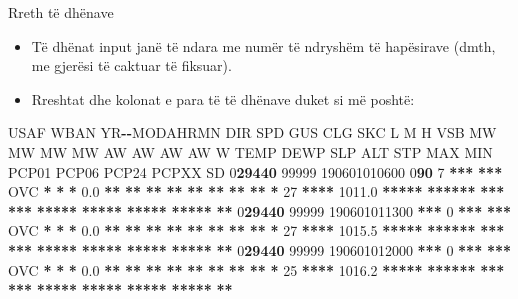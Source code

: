 \documentclass[
  ignorenonframetext,
]{beamer}
\newenvironment{Shaded}{\begin{snugshade}}{\end{snugshade}}
\newcommand{\DecValTok}[1]{\textcolor[rgb]{0.00,0.00,0.81}{#1}}
\newcommand{\ErrorTok}[1]{\textcolor[rgb]{0.64,0.00,0.00}{\textbf{#1}}}
\newcommand{\FloatTok}[1]{\textcolor[rgb]{0.00,0.00,0.81}{#1}}
\newcommand{\NormalTok}[1]{#1}
\newcommand{\OperatorTok}[1]{\textcolor[rgb]{0.81,0.36,0.00}{\textbf{#1}}}
\begin{document}
\begin{frame}[fragile]{Rreth të dhënave}
\protect\hypertarget{rreth-tuxeb-dhuxebnave}{}
\begin{itemize}
\item
  Të dhënat input janë të ndara me numër të ndryshëm të hapësirave
  (dmth, me gjerësi të caktuar të fiksuar).
\item
  Rreshtat dhe kolonat e para të të dhënave duket si më poshtë:
\end{itemize}

\begin{Shaded}
\begin{Highlighting}[]
\NormalTok{  USAF  WBAN YR}\OperatorTok{{-}{-}}\NormalTok{MODAHRMN DIR SPD GUS CLG SKC L M H  VSB MW MW MW MW AW AW AW AW W TEMP DEWP    SLP   ALT    STP MAX MIN PCP01 PCP06 PCP24 PCPXX SD}
\DecValTok{0}\ErrorTok{29440} \DecValTok{99999} \DecValTok{190601010600} \DecValTok{0}\ErrorTok{90}   \DecValTok{7} \OperatorTok{***} \OperatorTok{***}\NormalTok{ OVC }\OperatorTok{*} \OperatorTok{*} \OperatorTok{*}  \FloatTok{0.0} \OperatorTok{**} \OperatorTok{**} \OperatorTok{**} \OperatorTok{**} \OperatorTok{**} \OperatorTok{**} \OperatorTok{**} \OperatorTok{**} \OperatorTok{*}   \DecValTok{27} \OperatorTok{****} \FloatTok{1011.0} \OperatorTok{*****} \OperatorTok{******} \OperatorTok{***} \OperatorTok{***} \OperatorTok{*****} \OperatorTok{*****} \OperatorTok{*****} \OperatorTok{*****} \OperatorTok{**} 
\DecValTok{0}\ErrorTok{29440} \DecValTok{99999} \DecValTok{190601011300} \OperatorTok{***}   \DecValTok{0} \OperatorTok{***} \OperatorTok{***}\NormalTok{ OVC }\OperatorTok{*} \OperatorTok{*} \OperatorTok{*}  \FloatTok{0.0} \OperatorTok{**} \OperatorTok{**} \OperatorTok{**} \OperatorTok{**} \OperatorTok{**} \OperatorTok{**} \OperatorTok{**} \OperatorTok{**} \OperatorTok{*}   \DecValTok{27} \OperatorTok{****} \FloatTok{1015.5} \OperatorTok{*****} \OperatorTok{******} \OperatorTok{***} \OperatorTok{***} \OperatorTok{*****} \OperatorTok{*****} \OperatorTok{*****} \OperatorTok{*****} \OperatorTok{**} 
\DecValTok{0}\ErrorTok{29440} \DecValTok{99999} \DecValTok{190601012000} \OperatorTok{***}   \DecValTok{0} \OperatorTok{***} \OperatorTok{***}\NormalTok{ OVC }\OperatorTok{*} \OperatorTok{*} \OperatorTok{*}  \FloatTok{0.0} \OperatorTok{**} \OperatorTok{**} \OperatorTok{**} \OperatorTok{**} \OperatorTok{**} \OperatorTok{**} \OperatorTok{**} \OperatorTok{**} \OperatorTok{*}   \DecValTok{25} \OperatorTok{****} \FloatTok{1016.2} \OperatorTok{*****} \OperatorTok{******} \OperatorTok{***} \OperatorTok{***} \OperatorTok{*****} \OperatorTok{*****} \OperatorTok{*****} \OperatorTok{*****} \OperatorTok{**} 

\end{Highlighting}
\end{Shaded}
\end{frame}
\end{document}
